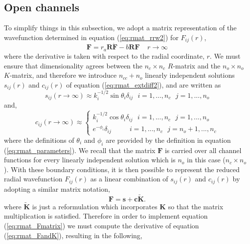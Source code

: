 \subsection{Open channels}\label{ssec:open}
To simplify things in this subsection, we adopt a matrix representation of the wavefunction determined in equation (\ref{eq:rmat_rrw2}) for $F_{ij}(r)$,
\begin{equation}\label{eq:rmat_Fmatrix}
\boldsymbol{F}=r_a\boldsymbol{R}\boldsymbol{\dot{F}}-b\boldsymbol{R}\boldsymbol{F} ~~~~~ r\rightarrow \infty
\end{equation}
where the derivative is taken with respect to the radial coordinate, $r$. We must ensure that dimensionality agrees between the $n_c\times n_c$ $R$-matrix and the $n_o \times n_o$ $K$-matrix, and therefore we introduce $n_{cc}+n_o$ linearly independent solutions $s_{ij}(r)$ and $c_{ij}(r)$ of equation (\ref{eq:rmat_extdiff2}), and are written as
\begin{equation}\label{eq:rmat_s}
s_{ij}(r\rightarrow \infty)\approx k_i^{-1/2}\sin\theta_i\delta_{ij} ~~~ i=1, ..., n_c ~~~ j=1, ..., n_o
\end{equation}
and,
\begin{equation}\label{eq:rmat_c}
c_{ij}(r \rightarrow \infty)\approx \left\{
  \begin{array}{lr}
     k_i^{-1/2}\cos\theta_i\delta_{ij} ~~~ i=1, ..., n_c ~~~ j=1, ..., n_o\\
    e^{-\phi_i}\delta_{ij} ~~~~~~~~~~~~ i=1, ..., n_c ~~~ j=n_o+1, ..., n_c
  \end{array}
\right.
\end{equation}
where the definitions of $\theta_i$ and $\phi_i$ are provided by the definition in equation (\ref{eq:rmat_parameters}). We recall that the matrix $\boldsymbol{F}$ is carried over all channel functions for every linearly independent solution which is $n_o$ in this case ($n_c\times n_o$). With these boundary conditions, it is then possible to represent the reduced radial wavefunction $F_{ij}(r)$ as a linear combination of $s_{ij}(r)$ and $c_{ij}(r)$ by adopting a similar matrix notation,
\begin{equation}\label{eq:rmat_FandK}
\boldsymbol{F}=\boldsymbol{s}+\boldsymbol{c}\boldsymbol{\tilde{K}}.
\end{equation}
where $\boldsymbol{\tilde{K}}$ is just a reformulation which incorporates $\boldsymbol{K}$ so that the matrix multiplication is satisfied. Therefore in order to implement equation (\ref{eq:rmat_Fmatrix}) we must compute the derivative of equation (\ref{eq:rmat_FandK}), resulting in the following,

